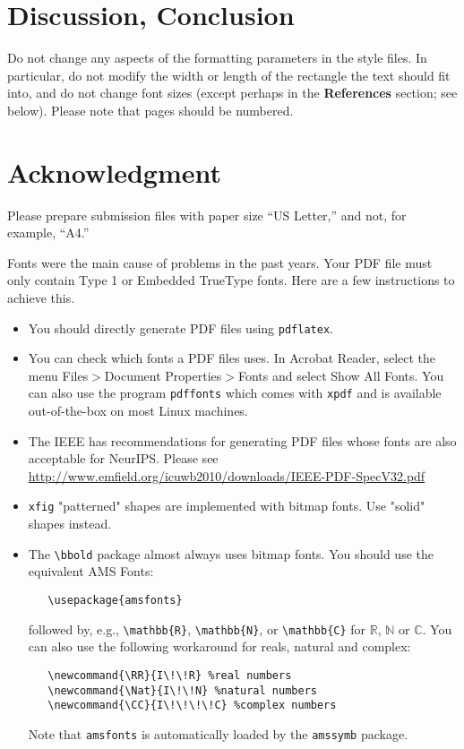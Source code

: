 \documentclass{article}
\begin{document}
\section{Discussion, Conclusion}

Do not change any aspects of the formatting parameters in the style files.  In
particular, do not modify the width or length of the rectangle the text should
fit into, and do not change font sizes (except perhaps in the
\textbf{References} section; see below). Please note that pages should be
numbered.

\section{Acknowledgment}

Please prepare submission files with paper size ``US Letter,'' and not, for
example, ``A4.''

Fonts were the main cause of problems in the past years. Your PDF file must only
contain Type 1 or Embedded TrueType fonts. Here are a few instructions to
achieve this.

\begin{itemize}

\item You should directly generate PDF files using \verb+pdflatex+.

\item You can check which fonts a PDF files uses.  In Acrobat Reader, select the
  menu Files$>$Document Properties$>$Fonts and select Show All Fonts. You can
  also use the program \verb+pdffonts+ which comes with \verb+xpdf+ and is
  available out-of-the-box on most Linux machines.

\item The IEEE has recommendations for generating PDF files whose fonts are also
  acceptable for NeurIPS. Please see
  \url{http://www.emfield.org/icuwb2010/downloads/IEEE-PDF-SpecV32.pdf}

\item \verb+xfig+ "patterned" shapes are implemented with bitmap fonts.  Use
  "solid" shapes instead.

\item The \verb+\bbold+ package almost always uses bitmap fonts.  You should use
  the equivalent AMS Fonts:
\begin{verbatim}
   \usepackage{amsfonts}
\end{verbatim}
followed by, e.g., \verb+\mathbb{R}+, \verb+\mathbb{N}+, or \verb+\mathbb{C}+
for $\mathbb{R}$, $\mathbb{N}$ or $\mathbb{C}$.  You can also use the following
workaround for reals, natural and complex:
\begin{verbatim}
   \newcommand{\RR}{I\!\!R} %real numbers
   \newcommand{\Nat}{I\!\!N} %natural numbers
   \newcommand{\CC}{I\!\!\!\!C} %complex numbers
\end{verbatim}
Note that \verb+amsfonts+ is automatically loaded by the \verb+amssymb+ package.

\end{itemize}
\end{document}
